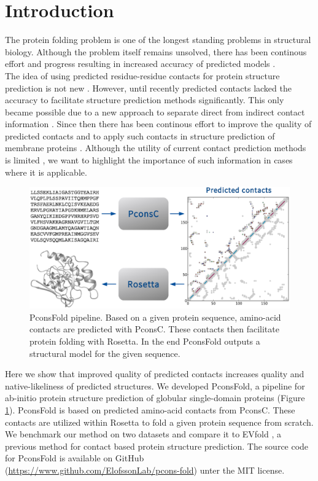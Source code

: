 \documentclass{bioinfo}
\begin{document}
\section{Introduction}
The protein folding problem is one of the longest standing problems in structural biology. Although the problem itself remains unsolved, there has been continous effort and progress resulting in increased accuracy of predicted models \cite[]{kryshtafovych_CASP10_2013}. \\\indent
The idea of using predicted residue-residue contacts for protein structure prediction is not new \cite[]{CITATION NEEDED}. However, until recently \cite[]{marks_protein_2011} predicted contacts lacked the accuracy to facilitate structure prediction methods significantly. This only became possible due to a new approach to separate direct from indirect contact information \cite[]{burger_disentangling_2010}. Since then there has been continous effort to improve the quality of predicted contacts \cite[]{morcos_direct-coupling_2011, jones_PSICOV:_2012, ekeberg_improved_2013, skwark_PconsC:_2013} and to apply such contacts in structure prediction of membrane proteins \cite[]{hopf_three-dimensional_2012, nugent_accurate_2012}. Although the utility of current contact prediction methods is limited \cite[]{kamisetty_assessing_2013}, we want to highlight the importance of such information in cases where it is applicable. \\\indent
\begin{figure}[!tpb]%
    \centerline{\includegraphics[scale=0.35]{figures/pipeline.eps}}
\caption{PconsFold pipeline. Based on a given protein sequence, amino-acid contacts are predicted with PconsC. These contacts then facilitate protein folding with Rosetta. In the end PconsFold outputs a structural model for the given sequence.}\label{fig:pipeline}
\end{figure}
Here we show that improved quality of predicted contacts increases quality and native-likeliness of predicted structures. We developed PconsFold, a pipeline for ab-initio protein structure prediction of globular single-domain proteins (Figure \ref{fig:pipeline}). PconsFold is based on predicted amino-acid contacts from PconsC. These contacts are utilized within Rosetta to fold a given protein sequence from scratch. We benchmark our method on two datasets and compare it to EVfold  \cite[]{marks_protein_2011}, a previous method for contact based protein structure prediction. The source code for PconsFold is available on GitHub (\url{https://www.github.com/ElofssonLab/pcons-fold}) unter the MIT license.
\end{document}
